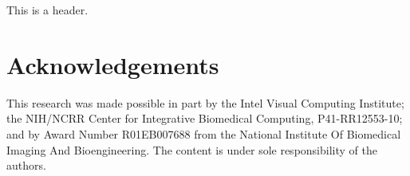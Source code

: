 This is a header.

\section{Acknowledgements}

This research was made possible in part by the Intel Visual Computing
Institute; the NIH/NCRR Center for Integrative Biomedical Computing,
P41-RR12553-10; and by Award Number R01EB007688 from the National
Institute Of Biomedical Imaging And Bioengineering.  The content is
under sole responsibility of the authors.
